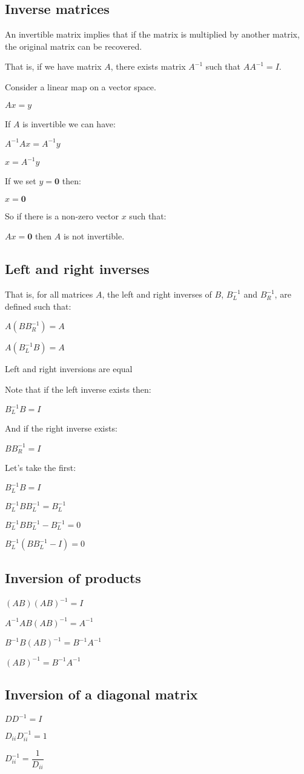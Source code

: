 
\subsection{Inverse matrices}

An invertible matrix implies that if the matrix is multiplied by another matrix, the original matrix can be recovered.

That is, if we have matrix \(A\), there exists matrix \(A^{-1}\) such that \(AA^{-1}=I\).

Consider a linear map on a vector space.

\(Ax=y\)

If \(A\) is invertible we can have:

\(A^{-1}Ax=A^{-1}y\)

\(x=A^{-1}y\)

If we set \(y=\mathbf 0\) then:

\(x=\mathbf 0\)

So if there is a non-zero vector \(x\) such that:

\(Ax=\mathbf 0\) then \(A\) is not invertible.

\subsection{Left and right inverses}

That is, for all matrices \(A\), the left and right inverses of \(B\), \(B_L^{-1}\) and \(B_R^{-1}\), are defined such that:

\(A(BB_R^{-1})=A\)

\(A(B_L^{-1}B)=A\)

Left and right inversions are equal

Note that if the left inverse exists then:

\(B_L^{-1}B=I\)

And if the right inverse exists:

\(BB_R^{-1}=I\)

Let’s take the first:

\(B_L^{-1}B=I\)

\(B_L^{-1}BB_L^{-1}=B_L^{-1}\)

\(B_L^{-1}BB_L^{-1}-B_L^{-1}=0\)

\(B_L^{-1}(BB_L^{-1}-I)=0\)

\subsection{Inversion of products}

\((AB)(AB)^{-1}=I\)

\(A^{-1}AB(AB)^{-1}=A^{-1}\)

\(B^{-1}B(AB)^{-1}=B^{-1}A^{-1}\)

\((AB)^{-1}=B^{-1}A^{-1}\)

\subsection{Inversion of a diagonal matrix}

\(DD^{-1}=I\)

\(D_{ii}D_{ii}^{-1}=1\)

\(D_{ii}^{-1}=\dfrac{1}{D_{ii}}\)

